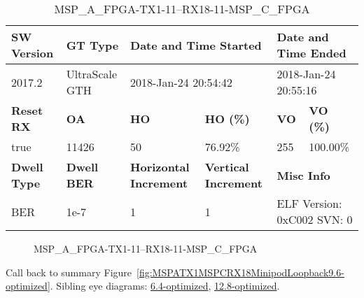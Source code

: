 \begin{table}[h]
\centering
\caption{MSP\_A\_FPGA-TX1-11--RX18-11-MSP\_C\_FPGA}
\label{tab:MSPAFPGATX111RX1811MSPCFPGA9.6-optimized}
\begin{tabular}{@{}|l|l|l|l|l|l|@{}}
\toprule
\textbf{SW Version}                & \textbf{GT Type}   & \multicolumn{2}{l|}{\textbf{Date and Time Started}}            & \multicolumn{2}{l|}{\textbf{Date and Time Ended}}        \\ \midrule
2017.2                       & UltraScale GTH          & \multicolumn{2}{l|}{2018-Jan-24 20:54:42}                   & \multicolumn{2}{l|}{2018-Jan-24 20:55:16}               \\ \midrule
\textbf{Reset RX}                  & \textbf{OA} & \textbf{HO}   & \textbf{HO (\%)} & \textbf{VO} & \textbf{VO (\%)} \\ \midrule
true & 11426        & 50          & 76.92\%        & 255        & 100.00\%       \\ \midrule
\textbf{Dwell Type}                & \textbf{Dwell BER} & \textbf{Horizontal Increment} & \textbf{Vertical Increment}    & \multicolumn{2}{l|}{\textbf{Misc Info}}                  \\ \midrule
BER                            & 1e-7        & 1        & 1           & \multicolumn{2}{l|}{ELF Version: 0xC002 SVN: 0}                         \\ \bottomrule
\end{tabular}
\end{table}

\begin{figure}[h]
\caption{MSP\_A\_FPGA-TX1-11--RX18-11-MSP\_C\_FPGA} \label{fig:MSPAFPGATX111RX1811MSPCFPGA9.6-optimized}
\end{figure}

Call back to summary Figure~\ref{fig:MSPATX1MSPCRX18MinipodLoopback9.6-optimized}.
Sibling eye diagrams: \hyperref[sec:MSPAFPGATX111RX1811MSPCFPGA6.4-optimized]{6.4-optimized}, \hyperref[sec:MSPAFPGATX111RX1811MSPCFPGA12.8-optimized]{12.8-optimized}.

\clearpage
\newpage

